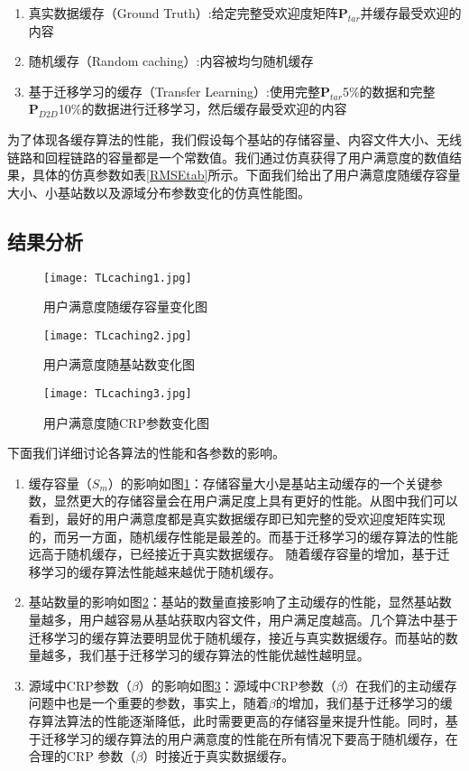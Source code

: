 \documentclass[bachelor]{seuthesis} %
\begin{document}
\begin{Main}
\begin{enumerate}
\item 真实数据缓存（Ground Truth）:给定完整受欢迎度矩阵$\textbf{P}_{tar}$并缓存最受欢迎的内容
\item 随机缓存（Random caching）:内容被均匀随机缓存
\item 基于迁移学习的缓存（Transfer Learning）:使用完整$\textbf{P}_{tar}$5\%的数据和完整$\textbf{P}_{D2D}$10\%的数据进行迁移学习，然后缓存最受欢迎的内容
\end{enumerate}
为了体现各缓存算法的性能，我们假设每个基站的存储容量、内容文件大小、无线链路和回程链路的容量都是一个常数值。我们通过仿真获得了用户满意度的数值结果，具体的仿真参数如表\ref{RMSEtab}所示。下面我们给出了用户满意度随缓存容量大小、小基站数以及源域分布参数变化的仿真性能图。
\subsection{结果分析}
\begin{figure}{}
\centering
\texttt{[image: TLcaching1.jpg]}
\caption{用户满意度随缓存容量变化图}\label{TLp1}
\end{figure}
\begin{figure}{}
\centering
\texttt{[image: TLcaching2.jpg]}
\caption{用户满意度随基站数变化图}\label{TLp2}
\end{figure}
\begin{figure}{}
\centering
\texttt{[image: TLcaching3.jpg]}
\caption{用户满意度随CRP参数变化图}\label{TLp3}
\end{figure}
下面我们详细讨论各算法的性能和各参数的影响。
\begin{enumerate}
\item 缓存容量（$S_m$）的影响如图\ref{TLp1}：存储容量大小是基站主动缓存的一个关键参数，显然更大的存储容量会在用户满足度上具有更好的性能。从图中我们可以看到，最好的用户满意度都是真实数据缓存即已知完整的受欢迎度矩阵实现的，而另一方面，随机缓存性能是最差的。而基于迁移学习的缓存算法的性能远高于随机缓存，已经接近于真实数据缓存。
    随着缓存容量的增加，基于迁移学习的缓存算法性能越来越优于随机缓存。
\item 基站数量的影响如图\ref{TLp2}：基站的数量直接影响了主动缓存的性能，显然基站数量越多，用户越容易从基站获取内容文件，用户满足度越高。几个算法中基于迁移学习的缓存算法要明显优于随机缓存，接近与真实数据缓存。而基站的数量越多，我们基于迁移学习的缓存算法的性能优越性越明显。
\item 源域中CRP参数（$\beta$）的影响如图\ref{TLp3}：源域中CRP参数（$\beta$）在我们的主动缓存问题中也是一个重要的参数，事实上，随着$\beta$的增加，我们基于迁移学习的缓存算法算法的性能逐渐降低，此时需要更高的存储容量来提升性能。同时，基于迁移学习的缓存算法的用户满意度的性能在所有情况下要高于随机缓存，在合理的CRP 参数（$\beta$）时接近于真实数据缓存。
\end{enumerate}

\end{Main}
\end{document}
